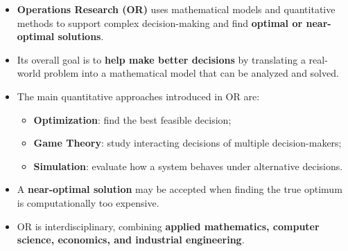 \highspace
\begin{takeawaysbox}
    \begin{itemize}
        \item \textbf{Operations Research (OR)} uses mathematical models and quantitative methods to support complex decision-making and find \textbf{optimal or near-optimal solutions}.

        \item Its overall goal is to \textbf{help make better decisions} by translating a real-world problem into a mathematical model that can be analyzed and solved.

        \item The main quantitative approaches introduced in OR are:
            \begin{itemize}
                \item \textbf{Optimization}: find the best feasible decision;
                \item \textbf{Game Theory}: study interacting decisions of multiple decision-makers;
                \item \textbf{Simulation}: evaluate how a system behaves under alternative decisions.
            \end{itemize}

        \item A \textbf{near-optimal solution} may be accepted when finding the true optimum is computationally too expensive.

        \item OR is interdisciplinary, combining \textbf{applied mathematics, computer science, economics, and industrial engineering}.
    \end{itemize}
\end{takeawaysbox}